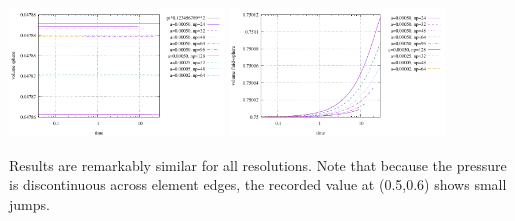 \begin{center}
\includegraphics[width=5.7cm]{python_codes/fieldstone_93/results/vol_sphere}
\includegraphics[width=5.7cm]{python_codes/fieldstone_93/results/vol_fluidsphere}
\end{center}

Results are remarkably similar for all resolutions. Note that because the pressure 
is discontinuous across element edges, the recorded value at (0.5,0.6) shows small
jumps.













